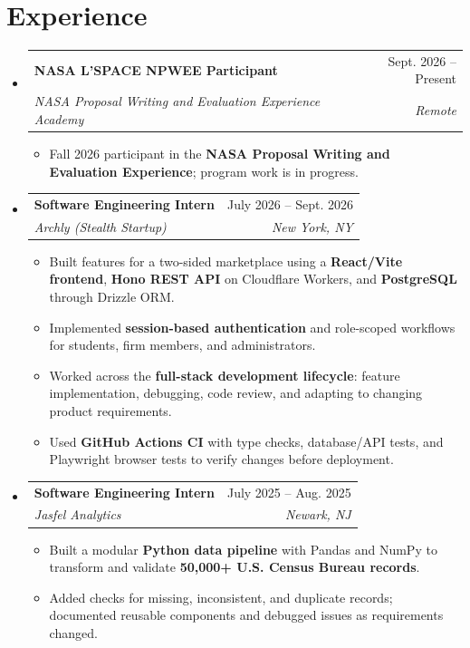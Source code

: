\documentclass[letterpaper,10pt]{article}
\makeatletter
\newcommand{\resumeItem}[1]{\item\small{#1}}
\newcommand{\resumeSubheading}[4]{
  \vspace{1pt}\item
  \begin{tabular*}{0.97\textwidth}[t]{l@{\extracolsep{\fill}}r}
    \textbf{#1} & #2 \\
    \textit{\small #3} & \textit{\small #4} \\
  \end{tabular*}\vspace{-3pt}
}
\newcommand{\resumeSubHeadingListStart}{\begin{itemize}[leftmargin=0.15in,label={},itemsep=0pt,topsep=0pt]}
\newcommand{\resumeSubHeadingListEnd}{\end{itemize}}
\newcommand{\resumeItemListStart}{\begin{itemize}[leftmargin=0.15in,label=\textbullet,itemsep=-2pt,topsep=0pt]}
\newcommand{\resumeItemListEnd}{\end{itemize}\vspace{0pt}}
\makeatother
\begin{document}
\section{Experience}
\resumeSubHeadingListStart
  \resumeSubheading{NASA L'SPACE NPWEE Participant}{Sept. 2026 -- Present}
    {NASA Proposal Writing and Evaluation Experience Academy}{Remote}
    \resumeItemListStart
      \resumeItem{Fall 2026 participant in the \textbf{NASA Proposal Writing and Evaluation Experience}; program work is in progress.}
    \resumeItemListEnd
  \resumeSubheading{Software Engineering Intern}{July 2026 -- Sept. 2026}
    {Archly (Stealth Startup)}{New York, NY}
    \resumeItemListStart
      \resumeItem{Built features for a two-sided marketplace using a \textbf{React/Vite frontend}, \textbf{Hono REST API} on Cloudflare Workers, and \textbf{PostgreSQL} through Drizzle ORM.}
      \resumeItem{Implemented \textbf{session-based authentication} and role-scoped workflows for students, firm members, and administrators.}
      \resumeItem{Worked across the \textbf{full-stack development lifecycle}: feature implementation, debugging, code review, and adapting to changing product requirements.}
      \resumeItem{Used \textbf{GitHub Actions CI} with type checks, database/API tests, and Playwright browser tests to verify changes before deployment.}
    \resumeItemListEnd
  \resumeSubheading{Software Engineering Intern}{July 2025 -- Aug. 2025}
    {Jasfel Analytics}{Newark, NJ}
    \resumeItemListStart
      \resumeItem{Built a modular \textbf{Python data pipeline} with Pandas and NumPy to transform and validate \textbf{50,000+ U.S. Census Bureau records}.}
      \resumeItem{Added checks for missing, inconsistent, and duplicate records; documented reusable components and debugged issues as requirements changed.}
    \resumeItemListEnd
\resumeSubHeadingListEnd
\end{document}
